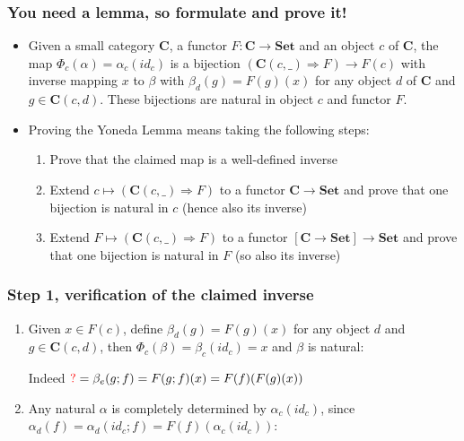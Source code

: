 \documentclass[handout]{beamer}
\newcommand{\To}{\Rightarrow}
\newcommand{\redc}{{\color{red} c}}
\newcommand{\bfsf}[1]{{\boldsymbol{#1}}}
\newcommand{\Set}{\bfsf{Set}}
\newcommand{\CC}{\bfsf{C}}
\begin{document}
\frame
  {   
    \frametitle{You need a lemma, so formulate and prove it!}\label{Yon:Intro}

 \begin{itemize}[<+->]
\item Given a small category $\CC$, a functor $F:\CC\to\Set$ and an
object $c$ of $\CC$, the map $\Phi_c(\alpha) = \alpha_c(id_c)$ is
a bijection $(\CC(c,\_)\To F)\to F(c)$ with inverse mapping $x$ to $\beta$
with $\beta_d(g)=F(g)(x)$ for any object $d$ of $\CC$ and $g\in\CC(c,d)$.
These bijections are natural in object $c$ and functor $F$.
\item Proving the Yoneda Lemma means taking the following steps:
 \begin{enumerate}
    \item Prove that the claimed map is a well-defined inverse
    \item Extend $c\mapsto(\CC(c,\_)\To F)$ to a functor $\CC\to\Set$ and
prove that one bijection is natural in $c$ (hence also its inverse)
    \item Extend $F\mapsto(\CC(c,\_)\To F)$ to a functor $[\CC\to\Set]\to\Set$ and
prove that one bijection is natural in $F$ (so also its inverse)
   \end{enumerate}
 \end{itemize}

 }

\frame
  {   
    \frametitle{Step 1, verification of the claimed inverse}\label{Yon:bijection}

 \begin{enumerate}[<+->]
\item Given $x\in F(c)$, define $\beta_d(g)=F(g)(x)$ for any object $d$ 
and $g\in\CC(c,d)$, then $\Phi_c(\beta)=\beta_c(id_c) =x$ and $\beta$ is natural:
Indeed ${\color{red} ?}=\beta_e(g;f)=F(g;f)(x) = F(f)(F(g)(x))$
\item Any natural $\alpha$ is completely determined by $\alpha_c(id_c)$, 
since $\alpha_d(f)=\alpha_d(id_c;f)=F(f)(\alpha_c(id_c))$:\\
 \end{enumerate}

 }
\end{document}

